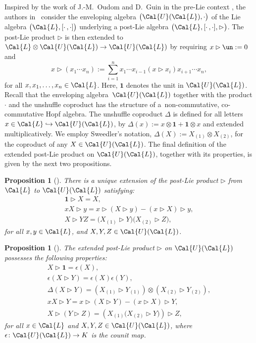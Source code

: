 \documentclass[10pt,a4paper]{amsart}
\numberwithin{equation}{section}
\newtheorem{Proposition}[Theorem]{Proposition}
 { \theoremstyle{definition}
\newtheorem{Definition}[Theorem]{Definition}
\newtheorem{Note}[Theorem]{Note}
\newtheorem{Example}[Theorem]{Example}
\newtheorem{Remark}[Theorem]{Remark} }
\begin{document}
Inspired by the work of J.-M.~Oudom and D.~Guin in the pre-Lie context \cite{OG2008}, the authors in~\cite{ELM2015} consider the enveloping algebra $\big(\Cal{U}(\Cal{L}),\cdot\big)$ of the Lie algebra $\big(\Cal{L}, [\cdot\,,\cdot ]\big)$ underlying a post-Lie algebra $\big(\Cal{L}, [\cdot\,,\cdot ],\rhd\big)$. The post-Lie product $\rhd$ is then extended to $\Cal{L} \otimes \Cal{U}(\Cal{L}) \rightarrow \Cal{U}(\Cal{L})$ by requiring $x\rhd\un:=0$ and
\begin{displaymath}
x\rhd(x_1\cdots x_n) := \sum_{i=1}^{n}{x_1 \cdots x_{i-1}(x \rhd x_i)x_{i+1}\cdots x_n},
\end{displaymath}
for all $x, x_1, \ldots, x_n \in \Cal{L}$. Here, $\mathbf{1}$ denotes the unit in $\Cal{U}(\Cal{L})$. Recall that the enveloping alge\-bra~$\Cal{U}(\Cal{L})$ together with the product $\cdot$ and the unshuffle coproduct has the structure of a~non-commutative, co-commutative Hopf algebra. The unshuffle coproduct $\Delta$ is defined for all letters $x \in \Cal{L} \hookrightarrow \Cal{U}(\Cal{L})$, by $\Delta(x):= x \otimes \mathbf{1} + \mathbf{1} \otimes x$ and extended multiplicatively. We employ Sweedler's notation, $\Delta(X):= X_{(1)} \otimes X_{(2)}$, for the coproduct of any $X \in \Cal{U}(\Cal{L})$. The final defi\-ni\-tion of the extended post-Lie product on $\Cal{U}(\Cal{L})$, together with its properties, is given by the next two propositions.
\begin{Proposition}[{\cite[Proposition 3.1]{ELM2015}}]%
There is a unique extension of the post-Lie product $\rhd$ from $\Cal{L}$ to $\Cal{U}(\Cal{L})$ satisfying:
\begin{gather*}
\mathbf{1} \rhd X = X,
\\
x X \rhd y = x \rhd (X \rhd y) - (x \rhd X) \rhd y,
\\
X \rhd Y Z = \big(X_{(1)} \rhd Y\big)\big(X_{(2)} \rhd Z\big),
\end{gather*}
for all $x, y \in \Cal{L}$, and $X, Y, Z \in \Cal{U}(\Cal{L})$.
\end{Proposition}

\begin{Proposition}[{\cite[Proposition 3.2]{ELM2015}}]
\label{prop:2}
The extended post-Lie product $\rhd$ on $\Cal{U}(\Cal{L})$ possesses the following properties:
\begin{gather*}
X \rhd \mathbf{1} = \epsilon(X),
\\
\epsilon(X \rhd Y) = \epsilon(X)\epsilon(Y),
\\
\Delta(X \rhd Y) = (X_{(1)} \rhd Y_{(1)}) \otimes (X_{(2)} \rhd Y_{(2)}),
\\
x X \rhd Y = x \rhd (X \rhd Y) - (x \rhd X) \rhd Y,
\\
X \rhd (Y \rhd Z) = (X_{(1)}\big(X_{(2)} \rhd Y\big)) \rhd Z,
\end{gather*}
for all $x \in \Cal{L}$ and $X, Y, Z \in \Cal{U}(\Cal{L})$, where $\epsilon\colon \Cal{U}(\Cal{L}) \rightarrow K$ is the counit map.
\end{Proposition}
\end{document}
